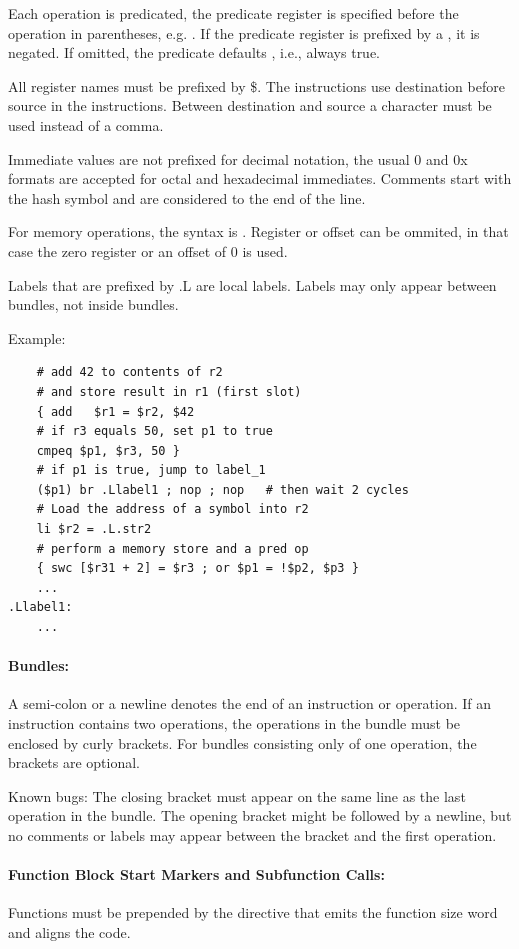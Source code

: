 Each operation is predicated, the predicate register is specified before the operation in
parentheses, e.g. .  If the predicate register is prefixed by a \code{!}, it is negated.
If omitted, the predicate defaults , i.e., always true.

All register names must be prefixed by \$. The instructions use destination before source in the
instructions. Between destination and source a \code{=} character must be used instead of a comma.

Immediate values are not prefixed for decimal notation, the usual 0 and 0x formats are accepted for
octal and hexadecimal immediates. Comments start with the hash symbol \code{\#} and are considered to the
end of the line.

For memory operations, the syntax is . Register or offset can be ommited, in
that case the zero register  or an offset of $0$ is used.

Labels that are prefixed by .L are local labels. Labels may only appear between bundles, not inside bundles.

Example:
\begin{verbatim}
    # add 42 to contents of r2
    # and store result in r1 (first slot)
    { add   $r1 = $r2, $42
    # if r3 equals 50, set p1 to true
    cmpeq $p1, $r3, 50 }
    # if p1 is true, jump to label_1
    ($p1) br .Llabel1 ; nop ; nop   # then wait 2 cycles
    # Load the address of a symbol into r2
    li $r2 = .L.str2
    # perform a memory store and a pred op
    { swc [$r31 + 2] = $r3 ; or $p1 = !$p2, $p3 }
    ...
.Llabel1:
    ...
\end{verbatim}


\paragraph{Bundles:}
A semi-colon \code{;} or a newline denotes the end of an instruction or operation. If an instruction contains
two operations, the operations in the bundle must be enclosed by curly brackets. For bundles consisting
only of one operation, the brackets are optional.

Known bugs:
The closing bracket must appear on the same line as the last operation in the bundle. The opening bracket might
be followed by a newline, but no comments or labels may appear between the bracket and the first operation.


\paragraph{Function Block Start Markers and Subfunction Calls:}
Functions must be prepended by the  directive that emits the function size word and aligns the
code.

